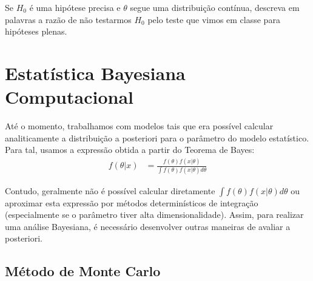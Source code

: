 \begin{exercise}
 Se $H_{0}$ é uma hipótese precisa e
 $\theta$ segue uma distribuição contínua,
 descreva em palavras a razão de não testarmos $H_{0}$
 pelo teste que vimos em classe para hipóteses plenas.
\end{exercise}




\section{Estatística Bayesiana Computacional}

Até o momento, trabalhamos com modelos tais que
era possível calcular analiticamente 
a distribuição a posteriori para o parâmetro do
modelo estatístico. Para tal, usamos a expressão
obtida a partir do Teorema de Bayes:
\begin{align*}
 f(\theta|x)
 &= \frac{f(\theta)f(x|\theta)}
 {\int{f(\theta)f(x|\theta)d\theta}}
\end{align*}

Contudo, geralmente não é possível calcular diretamente
$\int{f(\theta)f(x|\theta)d\theta}$
ou aproximar esta expressão por métodos determinísticos de
integração (especialmente se o parâmetro tiver
alta dimensionalidade). Assim, para
realizar uma análise Bayesiana, é necessário
desenvolver outras maneiras de avaliar a posteriori.

\subsection{Método de Monte Carlo}

